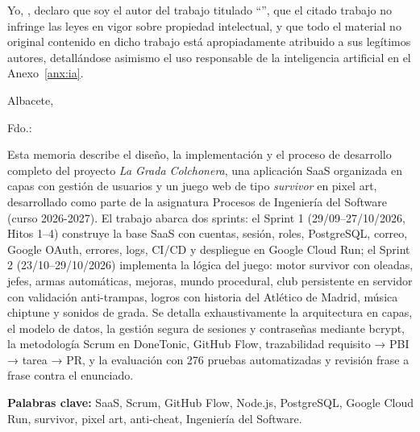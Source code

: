 Yo, \autor, declaro que soy el autor del trabajo titulado ``\titulo'', que el citado trabajo no infringe las leyes en vigor sobre propiedad intelectual, y que todo el material no original contenido en dicho trabajo está apropiadamente atribuido a sus legítimos autores, detallándose asimismo el uso responsable de la inteligencia artificial en el Anexo~\ref{anx:ia}.

\vspace*{2cm}
\begin{center}
Albacete, \fecha

\vskip3cm

Fdo.: \autor
\end{center}


\cleardoublepage
\thispagestyle{plain}
\begin{center}
\Large{}
\end{center}
\vskip1cm

Esta memoria describe el diseño, la implementación y el proceso de desarrollo completo del proyecto \textit{La Grada Colchonera}, una aplicación SaaS organizada en capas con gestión de usuarios y un juego web de tipo \textit{survivor} en pixel art, desarrollado como parte de la asignatura Procesos de Ingeniería del Software (curso 2026-2027). El trabajo abarca dos sprints: el Sprint 1 (29/09–27/10/2026, Hitos 1–4) construye la base SaaS con cuentas, sesión, roles, PostgreSQL, correo, Google OAuth, errores, logs, CI/CD y despliegue en Google Cloud Run; el Sprint 2 (23/10–29/10/2026) implementa la lógica del juego: motor survivor con oleadas, jefes, armas automáticas, mejoras, mundo procedural, club persistente en servidor con validación anti-trampas, logros con historia del Atlético de Madrid, música chiptune y sonidos de grada. Se detalla exhaustivamente la arquitectura en capas, el modelo de datos, la gestión segura de sesiones y contraseñas mediante bcrypt, la metodología Scrum en DoneTonic, GitHub Flow, trazabilidad requisito → PBI → tarea → PR, y la evaluación con 276 pruebas automatizadas y revisión frase a frase contra el enunciado.

\medskip
\noindent\textbf{Palabras clave:} SaaS, Scrum, GitHub Flow, Node.js, PostgreSQL, Google Cloud Run, survivor, pixel art, anti-cheat, Ingeniería del Software.

\cleardoublepage
\thispagestyle{plain}
\begin{center}
\Large{}
\end{center}
\vskip1cm


